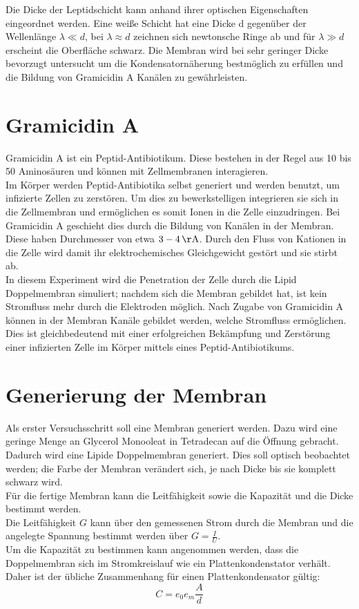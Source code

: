 \documentclass{include/thesisclass3}
\newcommand{\e}[1]{\,\si{#1}}
\begin{document}
Die Dicke der Leptidschicht kann anhand ihrer optischen Eigenschaften eingeordnet werden. Eine weiße Schicht hat eine Dicke d gegenüber der Wellenlänge $\lambda \ll d$, bei $\lambda \approx d$ zeichnen sich newtonsche Ringe ab und für $\lambda \gg d$ erscheint die Oberfläche schwarz. Die Membran wird bei sehr geringer Dicke bevorzugt untersucht um die Kondensatornäherung bestmöglich zu erfüllen und die Bildung von Gramicidin A Kanälen zu gewährleisten.

\section{Gramicidin A}
Gramicidin A ist ein Peptid-Antibiotikum. Diese bestehen in der Regel aus 10 bis 50 Aminosäuren und können mit Zellmembranen interagieren.\\
Im Körper werden Peptid-Antibiotika selbst generiert und werden benutzt, um infizierte Zellen zu zerstören.  Um dies zu bewerkstelligen integrieren sie sich in die Zellmembran und ermöglichen es somit Ionen in die Zelle einzudringen. Bei Gramicidin A geschieht dies durch die Bildung von Kanälen in der Membran. Diese haben Durchmesser von etwa $3 - 4\e{\AA}$. Durch den Fluss von Kationen in die Zelle wird damit ihr elektrochemisches Gleichgewicht gestört und sie stirbt ab.\\
In diesem Experiment wird die Penetration der Zelle durch die Lipid Doppelmembran simuliert; nachdem sich die Membran gebildet hat, ist kein Stromfluss mehr durch die Elektroden möglich. Nach Zugabe von Gramicidin A können in der Membran Kanäle gebildet werden, welche Stromfluss ermöglichen. Dies ist gleichbedeutend mit einer erfolgreichen Bekämpfung und Zerstörung einer infizierten Zelle im Körper mittels eines Peptid-Antibiotikums.




\section{Generierung der Membran}
Als erster Versuchsschritt soll eine Membran generiert werden. Dazu wird eine geringe Menge an Glycerol Monooleat in Tetradecan auf die Öffnung gebracht. Dadurch wird eine Lipide Doppelmembran generiert. Dies soll optisch beobachtet werden; die Farbe der Membran verändert sich, je nach Dicke bis sie komplett schwarz wird.\\
Für die fertige Membran kann die Leitfähigkeit sowie die Kapazität und die Dicke bestimmt werden. \\Die Leitfähigkeit $G$ kann über den gemessenen Strom durch die Membran und die angelegte Spannung bestimmt werden über $G = \frac{I}{U}$. \\Um die Kapazität zu bestimmen kann angenommen werden, dass die Doppelmembran  sich im Stromkreislauf wie ein Plattenkondenstator verhält. Daher ist der übliche Zusammenhang für einen Plattenkondensator gültig:
\begin{equation}
C = e_0e_m \frac{A}{d}
\end{equation}
\end{document}
